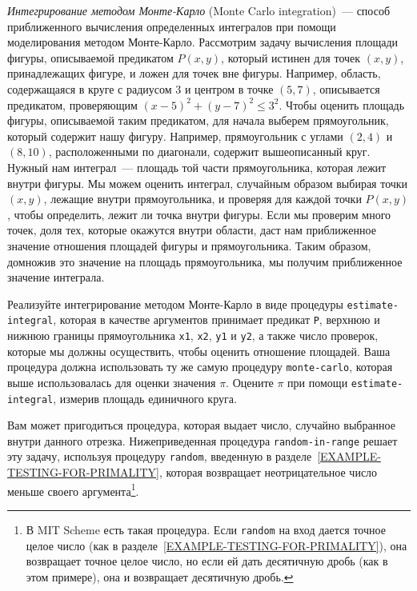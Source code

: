 \begin{exercise}{3.5}\label{EX3.5}%
%
%
%
{\em Интегрирование методом
Монте-Карло} (Monte Carlo integration)~--- способ приближенного
вычисления определенных интегралов при помощи
моделирования методом Монте-Карло.  Рассмотрим
задачу вычисления площади фигуры, описываемой предикатом
$P(x,y)$, который истинен для точек
$(x,y)$, принадлежащих фигуре, и ложен для
точек вне фигуры.  Например, область, содержащаяся в круге с радиусом
3 и центром в точке $(5,7)$, описывается предикатом, проверяющим
$(x-5)^2 + (y-7)^2 \le 3^2$.  Чтобы оценить
площадь фигуры, описываемой таким предикатом, для начала выберем
прямоугольник, который содержит нашу фигуру.  Например, прямоугольник
с углами $(2,4)$ и $(8,10)$, расположенными по диагонали, содержит
вышеописанный круг.  Нужный нам интеграл~--- площадь той части
прямоугольника, которая лежит внутри фигуры.  Мы можем оценить
интеграл, случайным образом выбирая точки
$(x,y)$, лежащие внутри прямоугольника, и
проверяя для каждой точки $P(x,y)$, чтобы
определить, лежит ли точка внутри фигуры.  Если мы проверим много
точек, доля тех, которые окажутся внутри области, даст нам
приближенное значение отношения площадей фигуры и прямоугольника.
Таким образом, домножив это значение на площадь прямоугольника, мы
получим приближенное значение интеграла.

Реализуйте интегрирование методом Монте-Карло в виде
процедуры {\tt estimate-integral},
которая в качестве
аргументов принимает предикат {\tt P}, верхнюю и нижнюю границы
прямоугольника {\tt x1}, {\tt x2}, {\tt y1}
и {\tt y2}, а также число
проверок, которые мы должны осуществить, чтобы оценить отношение
площадей.  Ваша процедура должна использовать ту же самую процедуру
{\tt monte-carlo}, которая выше использовалась для оценки
значения $\pi$.  Оцените $\pi$ при помощи
{\tt estimate-integral}, измерив площадь единичного круга.

Вам может пригодиться процедура, которая выдает
число, случайно выбранное внутри данного отрезка.  Нижеприведенная
процедура {\tt random-in-range} решает эту задачу, используя
процедуру {\tt random}, введенную в
разделе~\ref{EXAMPLE-TESTING-FOR-PRIMALITY}, которая возвращает
неотрицательное число меньше своего аргумента\footnote{В MIT Scheme есть такая процедура.
  Если {\tt random} на вход дается точное целое число (как в
  разделе~\ref{EXAMPLE-TESTING-FOR-PRIMALITY}), она возвращает
  точное целое число, но если ей дать десятичную дробь (как в этом
  примере), она и возвращает десятичную дробь.}.


\end{exercise}
